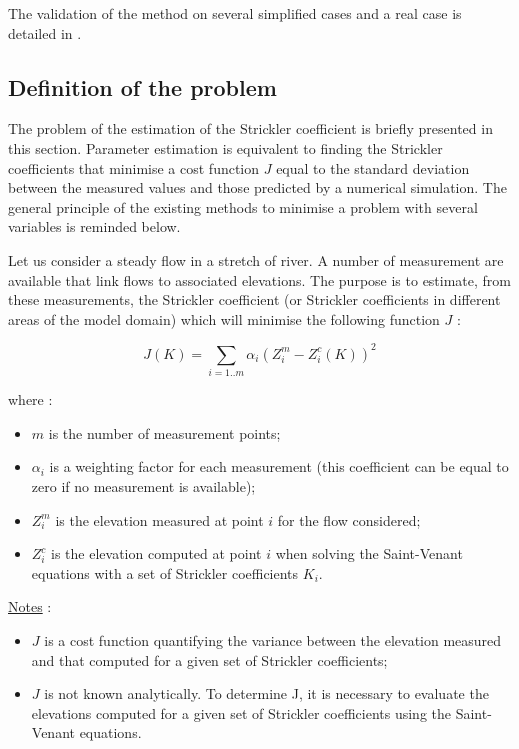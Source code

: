 \vspace{0.5cm}

The validation of the method on several simplified cases and a real case is detailed in \cite{GOUTAL05}.

\subsection{Definition of the problem}

\label{PosPb}

The problem of the estimation of the Strickler coefficient is briefly presented in this section. Parameter estimation is equivalent to finding the Strickler coefficients that minimise a cost function $J$ equal to the standard deviation between the measured values and those predicted by a numerical simulation. The general principle of the existing methods to minimise a problem with several variables is reminded below.

\vspace{0.5cm}

Let us consider a steady flow in a stretch of river. A number of measurement are available that link flows to associated elevations. The purpose is to estimate, from these measurements, the Strickler coefficient (or Strickler coefficients in different areas of the model domain) which will minimise the following function $J$ :

\begin{equation}
 J(K) = \sum_{i=1..m} \alpha_i ( Z_{i}^m - Z_{i}^c (K) )^2
\end{equation}

where :
\begin{itemize}
 \item $m$ is the number of measurement points;
 \item $\alpha_i$ is a weighting factor for each measurement (this coefficient can be equal to zero if no measurement is available);
 \item $Z_{i}^m$ is the elevation measured at point $i$ for the flow considered;
 \item $Z_{i}^c$ is the elevation computed at point $i$ when solving the Saint-Venant equations with a set of Strickler coefficients $K_i$.
\end{itemize}

\vspace{0.5cm}

\underline{Notes} :
\begin{itemize}
 \item $J$ is a cost function quantifying the variance between the elevation measured and that computed for a given set of Strickler coefficients;
 \item $J$ is not known analytically. To determine J, it is necessary to evaluate the elevations computed for a given set of Strickler coefficients using the Saint-Venant equations.
\end{itemize}


